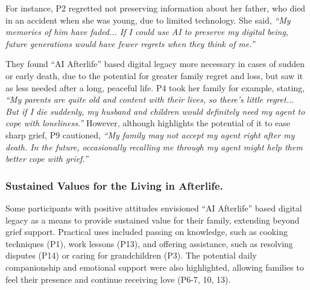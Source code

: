 For instance, P2 regretted not preserving information about her father, who died in an accident when she was young, due to limited technology. She said, \textit{``My memories of him have faded... If I could use AI to preserve my digital being, future generations would have fewer regrets when they think of me.''}

They found ``AI Afterlife'' based digital legacy more necessary in cases of sudden or early death, due to the potential for greater family regret and loss, but saw it as less needed after a long, peaceful life.
P4 took her family for example, stating, \textit{``My parents are quite old and content with their lives, so there's little regret... But if I die suddenly, my husband and children would definitely need my agent to cope with loneliness.''} 
However, although \cite{xygkou2023conversation} highlights the potential of it to ease sharp grief, P9 cautioned, \textit{``My family may not accept my agent right after my death. In the future, occasionally recalling me through my agent might help them better cope with grief.''}


\subsubsection{Sustained Values for the Living in Afterlife.}

Some participants with positive attitudes envisioned ``AI Afterlife'' based digital legacy as a means to provide sustained value for their family, extending beyond grief support. Practical uses included passing on knowledge, such as cooking techniques (P1), work lessons (P13), and offering assistance, such as resolving disputes (P14) or caring for grandchildren (P3). The potential daily companionship and emotional support were also highlighted, allowing families to feel their presence and continue receiving love (P6-7, 10, 13).

